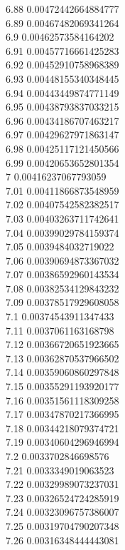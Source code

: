{6.88	0.00472442664884777\\
6.89	0.00467482069341264\\
6.9	0.00462573584164202\\
6.91	0.00457716661425283\\
6.92	0.00452910758968389\\
6.93	0.00448155340348445\\
6.94	0.00443449874771149\\
6.95	0.00438793837033215\\
6.96	0.00434186707463217\\
6.97	0.00429627971863147\\
6.98	0.00425117121450566\\
6.99	0.00420653652801354\\
7	0.00416237067793059\\
7.01	0.00411866873548959\\
7.02	0.00407542582382517\\
7.03	0.00403263711742641\\
7.04	0.00399029784159374\\
7.05	0.0039484032719022\\
7.06	0.00390694873367032\\
7.07	0.00386592960143534\\
7.08	0.00382534129843232\\
7.09	0.00378517929608058\\
7.1	0.00374543911347433\\
7.11	0.0037061163168798\\
7.12	0.00366720651923665\\
7.13	0.00362870537966502\\
7.14	0.00359060860297848\\
7.15	0.00355291193920177\\
7.16	0.00351561118309258\\
7.17	0.00347870217366995\\
7.18	0.00344218079374721\\
7.19	0.00340604296946994\\
7.2	0.0033702846698576\\
7.21	0.0033349019063523\\
7.22	0.00329989073237031\\
7.23	0.00326524724285919\\
7.24	0.00323096757386007\\
7.25	0.00319704790207348\\
7.26	0.00316348444443081\\
}
